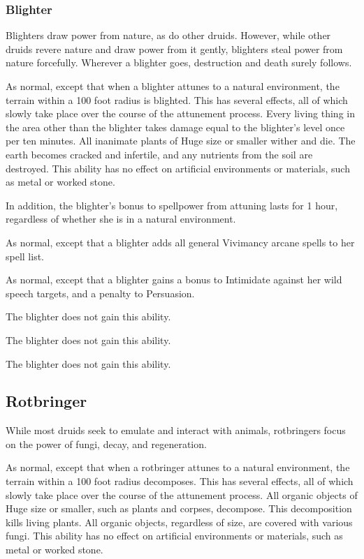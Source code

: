 \subsubsection{Blighter}

Blighters draw power from nature, as do other druids. However, while other druids revere nature and draw power from it gently, blighters steal power from nature forcefully. Wherever a blighter goes, destruction and death surely follows.

 As normal, except that when a blighter attunes to a natural environment, the terrain within a 100 foot radius is blighted.
This has several effects, all of which slowly take place over the course of the attunement process.
Every living thing in the area other than the blighter takes damage equal to the blighter's level once per ten minutes.
All inanimate plants of Huge size or smaller wither and die.
The earth becomes cracked and infertile, and any nutrients from the soil are destroyed.
This ability has no effect on artificial environments or materials, such as metal or worked stone.

In addition, the blighter's bonus to spellpower from attuning lasts for 1 hour, regardless of whether she is in a natural environment.

 As normal, except that a blighter adds all general Vivimancy arcane spells to her spell list.

 As normal, except that a blighter gains a  bonus to Intimidate against her wild speech targets, and a  penalty to Persuasion.

 The blighter does not gain this ability.

 The blighter does not gain this ability.


 The blighter does not gain this ability.


\subsection{Rotbringer}

While most druids seek to emulate and interact with animals, rotbringers focus on the power of fungi, decay, and regeneration.

 As normal, except that when a rotbringer attunes to a natural environment, the terrain within a 100 foot radius decomposes.
This has several effects, all of which slowly take place over the course of the attunement process.
All organic objects of Huge size or smaller, such as plants and corpses, decompose.
This decomposition kills living plants.
All organic objects, regardless of size, are covered with various fungi.
This ability has no effect on artificial environments or materials, such as metal or worked stone.

